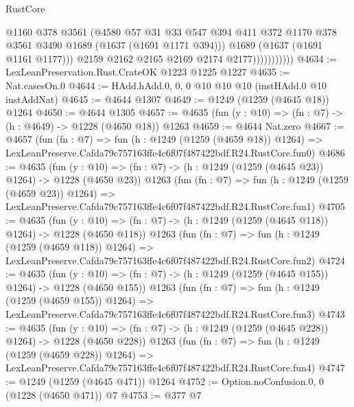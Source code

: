 \begin{lexlean}{RustCore}
\begin{coremodule}
                            @1160
                            @378
                            @3561
                            (@4580
                              @57
                              @31
                              @33
                              @547
                              @394
                              @411
                              @372
                              @1170
                              @378
                              @3561
                              @3490
                              @1689
                              (@1637 (@1691 @1171 @394)))
                            @1689
                            (@1637 (@1691 @1161 @1177)))
                          @2159
                          @2162
                          @2165
                          @2169
                          @2174
                          @2177)))))))))))
@4634 := LexLeanPreservation.Rust.CrateOK @1223 @1225 @1227
@4635 := Nat.casesOn.{0}
@4644 := HAdd.hAdd.{0, 0, 0} @10 @10 @10 (instHAdd.{0} @10 instAddNat)
@4645 := @4644 @1307
@4649 := @1249 (@1259 (@4645 @18)) @1264
@4650 := @4644 @1305
@4657 := @4635 (fun (y : @10) => (fn : @7) -> (h : @4649) -> @1228 (@4650 @18)) @1263
@4659 := @4644 Nat.zero
@4667 := @4657
    (fun (fn : @7) =>
    fun (h : @1249 (@1259 (@4659 @18)) @1264) =>
    LexLeanPreserve.Cafda79c757163ffe4c6f07f487422bdf.R24.RustCore.fun0)
@4686 := @4635
    (fun (y : @10) => (fn : @7) -> (h : @1249 (@1259 (@4645 @23)) @1264) -> @1228 (@4650 @23))
    @1263
    (fun (fn : @7) =>
    fun (h : @1249 (@1259 (@4659 @23)) @1264) =>
    LexLeanPreserve.Cafda79c757163ffe4c6f07f487422bdf.R24.RustCore.fun1)
@4705 := @4635
    (fun (y : @10) => (fn : @7) -> (h : @1249 (@1259 (@4645 @118)) @1264) -> @1228 (@4650 @118))
    @1263
    (fun (fn : @7) =>
    fun (h : @1249 (@1259 (@4659 @118)) @1264) =>
    LexLeanPreserve.Cafda79c757163ffe4c6f07f487422bdf.R24.RustCore.fun2)
@4724 := @4635
    (fun (y : @10) => (fn : @7) -> (h : @1249 (@1259 (@4645 @155)) @1264) -> @1228 (@4650 @155))
    @1263
    (fun (fn : @7) =>
    fun (h : @1249 (@1259 (@4659 @155)) @1264) =>
    LexLeanPreserve.Cafda79c757163ffe4c6f07f487422bdf.R24.RustCore.fun3)
@4743 := @4635
    (fun (y : @10) => (fn : @7) -> (h : @1249 (@1259 (@4645 @228)) @1264) -> @1228 (@4650 @228))
    @1263
    (fun (fn : @7) =>
    fun (h : @1249 (@1259 (@4659 @228)) @1264) =>
    LexLeanPreserve.Cafda79c757163ffe4c6f07f487422bdf.R24.RustCore.fun4)
@4747 := @1249 (@1259 (@4645 @471)) @1264
@4752 := Option.noConfusion.{0, 0} (@1228 (@4650 @471)) @7
@4753 := @377 @7

\end{coremodule}
\end{lexlean}
